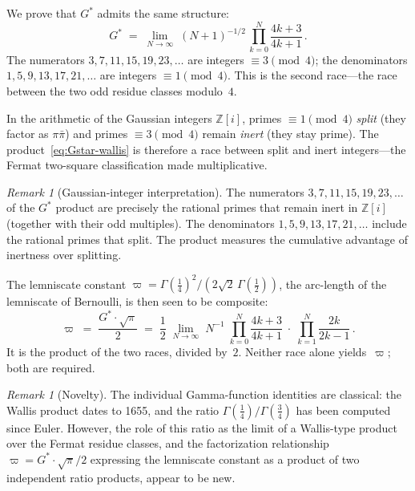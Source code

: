 \documentclass[12pt,reqno]{amsart}
\theoremstyle{definition}
\theoremstyle{remark}
\newtheorem{remark}[theorem]{Remark}
\newcommand{\ZZ}{\mathbb{Z}}
\newcommand{\Gstar}{G^{\!*}}
\newcommand{\varpiup}{\varpi}
\begin{document}
We prove that $\Gstar$ admits the same structure:
\begin{equation}\label{eq:Gstar-wallis}
  \Gstar \;=\; \lim_{N\to\infty}\;(N\!+\!1)^{-1/2}\,
  \prod_{k=0}^{N}\frac{4k+3}{4k+1}\,.
\end{equation}
The numerators $3, 7, 11, 15, 19, 23, \ldots$ are integers
$\equiv 3\pmod{4}$; the denominators $1, 5, 9, 13, 17, 21, \ldots$ are
integers $\equiv 1\pmod{4}$.  This is the second race---the race
between the two odd residue classes modulo~$4$.

In the arithmetic of the Gaussian integers $\ZZ[i]$, primes
$\equiv 1\pmod{4}$ \emph{split} (they factor as $\pi\bar{\pi}$) and
primes $\equiv 3\pmod{4}$ remain \emph{inert} (they stay prime).
The product~\eqref{eq:Gstar-wallis} is therefore a race between
split and inert integers---the Fermat two-square classification made
multiplicative.

\begin{remark}[Gaussian-integer interpretation]\label{rem:gaussian}
The numerators $3, 7, 11, 15, 19, 23, \ldots$ of the $\Gstar$ product
are precisely the rational primes that remain inert in $\ZZ[i]$ (together
with their odd multiples).  The denominators $1, 5, 9, 13, 17, 21,
\ldots$ include the rational primes that split.  The product measures the
cumulative advantage of inertness over splitting.
\end{remark}

The lemniscate constant $\varpiup = \Gamma(\tfrac14)^{2}/(2\sqrt{2}\,
\Gamma(\tfrac12))$, the arc-length of the lemniscate of Bernoulli,
is then seen to be composite:
\begin{equation}\label{eq:varpi-composite}
  \varpiup \;=\; \frac{\Gstar\cdot\sqrt{\pi}}{2}
  \;=\; \frac{1}{2}\;\lim_{N\to\infty}\;N^{-1}\;
  \prod_{k=0}^{N}\frac{4k+3}{4k+1}\;\cdot\;
  \prod_{k=1}^{N}\frac{2k}{2k-1}\,.
\end{equation}
It is the product of the two races, divided by~$2$.  Neither race alone
yields~$\varpiup$; both are required.

\begin{remark}[Novelty]\label{rem:novelty}
The individual Gamma-function identities are classical: the Wallis
product dates to 1655, and the ratio
$\Gamma(\tfrac14)/\Gamma(\tfrac34)$ has been computed since Euler.
However, the role of this ratio as the limit of a Wallis-type product
over the Fermat residue classes, and the factorization relationship
$\varpiup = \Gstar\!\cdot\!\sqrt{\pi}/2$ expressing the lemniscate
constant as a product of two independent ratio products, appear to be
new.
\end{remark}
\end{document}
